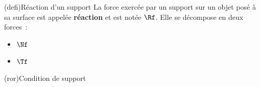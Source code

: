 \documentclass[../../main/main.tex]{subfiles}
\begin{document}
\begin{tcb*}[sidebyside, righthand ratio=.4](defi){Réaction d'un support}
	La force exercée par un support sur un objet posé à sa surface est appelée
	\textbf{réaction} et est notée $\Rf$. Elle se décompose en deux forces~:
	\psw{
		\[
			\Rf = \Nf + \Tf
			\qou
			\Rf = \Rf_N + \Rf_T
		\]
	}
	\vspace{-15pt}
	\begin{itemize}
		\item $\Nf$ 
		\item $\Tf$ 
	\end{itemize}
	\tcblower
	\begin{center}
		\vspace{-15pt}
	\end{center}
\end{tcb*}
\begin{tcb*}(ror){Condition de support}
\end{tcb*}
\end{document}
